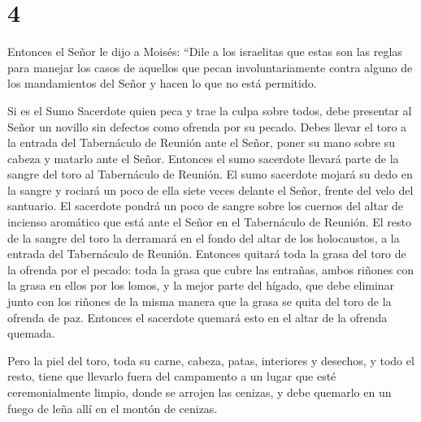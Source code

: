 \hypertarget{section-3}{%
\section{4}\label{section-3}}

 Entonces el Señor le dijo a Moisés:  ``Dile a
los israelitas que estas son las reglas para manejar los casos de
aquellos que pecan involuntariamente contra alguno de los mandamientos
del Señor y hacen lo que no está permitido.

 Si es el Sumo Sacerdote quien peca y trae la culpa sobre
todos, debe presentar al Señor un novillo sin defectos como ofrenda por
su pecado.  Debes llevar el toro a la entrada del
Tabernáculo de Reunión ante el Señor, poner su mano sobre su cabeza y
matarlo ante el Señor.  Entonces el sumo sacerdote llevará
parte de la sangre del toro al Tabernáculo de Reunión.  El
sumo sacerdote mojará su dedo en la sangre y rociará un poco de ella
siete veces delante el Señor, frente del velo del santuario.
 El sacerdote pondrá un poco de sangre sobre los cuernos del
altar de incienso aromático que está ante el Señor en el Tabernáculo de
Reunión. El resto de la sangre del toro la derramará en el fondo del
altar de los holocaustos, a la entrada del Tabernáculo de Reunión.
 Entonces quitará toda la grasa del toro de la ofrenda por
el pecado: toda la grasa que cubre las entrañas,  ambos
riñones con la grasa en ellos por los lomos, y la mejor parte del
hígado, que debe eliminar junto con los riñones  de la
misma manera que la grasa se quita del toro de la ofrenda de paz.
Entonces el sacerdote quemará esto en el altar de la ofrenda quemada.

 Pero la piel del toro, toda su carne, cabeza, patas,
interiores y desechos,  y todo el resto, tiene que llevarlo
fuera del campamento a un lugar que esté ceremonialmente limpio, donde
se arrojen las cenizas, y debe quemarlo en un fuego de leña allí en el
montón de cenizas.

